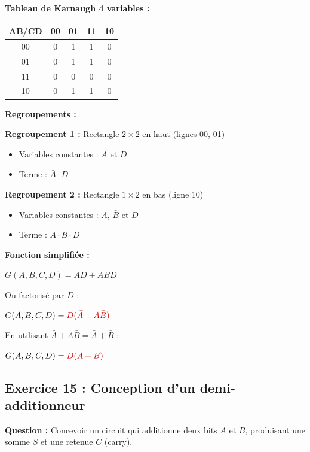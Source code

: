 \documentclass[12pt,a4paper]{article}
\begin{document}
\begin{solution}
\textbf{Tableau de Karnaugh 4 variables :}

\begin{center}
\begin{tabular}{|c|c|c|c|c|}
\hline
\textbf{AB/CD} & \textbf{00} & \textbf{01} & \textbf{11} & \textbf{10} \\
\hline
00 & 0 & 1 & 1 & 0 \\
\hline
01 & 0 & 1 & 1 & 0 \\
\hline
11 & 0 & 0 & 0 & 0 \\
\hline
10 & 0 & 1 & 1 & 0 \\
\hline
\end{tabular}
\end{center}

\textbf{Regroupements :}

\textbf{Regroupement 1 :} Rectangle $2 \times 2$ en haut (lignes 00, 01)
\begin{itemize}
    \item Variables constantes : $\bar{A}$ et $D$
    \item Terme : $\bar{A} \cdot D$
\end{itemize}

\textbf{Regroupement 2 :} Rectangle $1 \times 2$ en bas (ligne 10)
\begin{itemize}
    \item Variables constantes : $A$, $\bar{B}$ et $D$
    \item Terme : $A \cdot \bar{B} \cdot D$
\end{itemize}

\textbf{Fonction simplifiée :}

$G(A,B,C,D) = \bar{A}D + A\bar{B}D$

Ou factorisé par $D$ :

$G(A,B,C,D) = \textcolor{importantrouge}{D(\bar{A} + A\bar{B})}$

En utilisant $\bar{A} + A\bar{B} = \bar{A} + \bar{B}$ :

$G(A,B,C,D) = \textcolor{importantrouge}{D(\bar{A} + \bar{B})}$
\end{solution}

\newpage
\subsection{Exercice 15 : Conception d'un demi-additionneur}

\begin{exercice}
\textbf{Question :} Concevoir un circuit qui additionne deux bits $A$ et $B$, produisant une somme $S$ et une retenue $C$ (carry).
\end{exercice}
\end{document}
